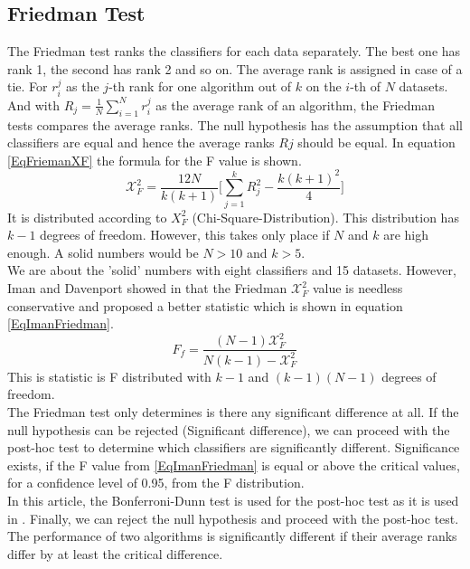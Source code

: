 \subsection{Friedman Test}
The Friedman test ranks the classifiers for each data separately. The best one has rank 1, the second has rank 2 and so on.
The average rank is assigned in case of a tie. For $r_i^j$ as the $j$-th rank for one algorithm out of $k$ on the $i$-th of $N$ datasets.
And with $R_j = \frac{1}{N}\sum_{i=1}^{N}r_i^j$ as the average rank of an algorithm, the Friedman tests compares the average ranks.
The null hypothesis has the assumption that all classifiers are equal and hence the average ranks $Rj$ should be equal.
In equation \eqref{EqFriemanXF} the formula for the F value is shown.
\begin{equation}\label{EqFriemanXF}
	\mathcal{X}_F^2 = \frac{12N}{k(k+1)}\Bigg[\sum_{j=1}^{k}R_j^2 - \frac{k(k+1)^2}{4} \Bigg]
\end{equation}
It is distributed according to $X_F^2$ (Chi-Square-Distribution).
This distribution has $k-1$ degrees of freedom. However, this takes only place if $N$ and $k$ are high enough.
A solid numbers would be $N>10$ and $k>5$. \cite[p. 11]{JanezDemsar.2006}\\ We are about the 'solid' numbers with eight classifiers and 15 datasets.
However, Iman and Davenport showed in \cite{RonaldL.Iman.} that the Friedman $\mathcal{X}_F^2$ value is needless conservative and proposed a better statistic which is shown in equation \eqref{EqImanFriedman}.\cite[p. 11]{JanezDemsar.2006}
\begin{equation}\label{EqImanFriedman}
	F_f= \frac{(N-1)\mathcal{X}_F^2}{N(k-1)-\mathcal{X}_F^2}
\end{equation}
This is statistic is F distributed with $k-1$ and $(k-1)(N-1)$ degrees of freedom.\\
The Friedman test only determines is there any significant difference at all. 
If the null hypothesis can be rejected (Significant difference), we can proceed with the post-hoc test to determine which classifiers are significantly different.
Significance exists, if the F value from \eqref{EqImanFriedman} is equal or above the critical values, for a confidence level of 0.95, from the F distribution.\cite[p.11]{JanezDemsar.2006}\\
In this article, the Bonferroni-Dunn test is used for the post-hoc test as it is used in \cite{Chen.2009}.
Finally, we can reject the null hypothesis and proceed with the post-hoc test.
The performance of two algorithms is significantly different if their average ranks differ by at least the critical difference. 
